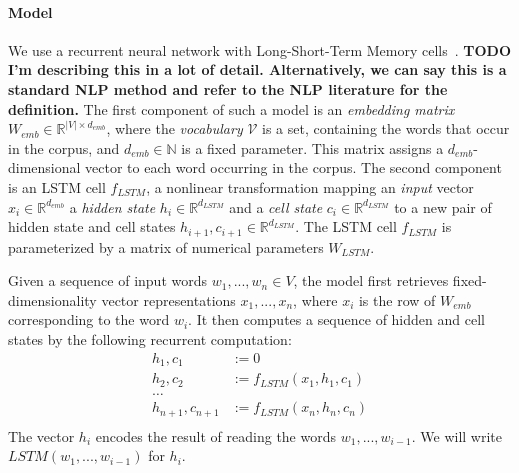\documentclass[11pt,letterpaper]{article}
\begin{document}


\paragraph{Model}
We use a recurrent neural network with Long-Short-Term Memory cells~\citep{hochreiter-long-1997}.
%
\textbf{TODO I'm describing this in a lot of detail. Alternatively, we can say this is a standard NLP method and refer to the NLP literature for the definition.}
The first component of such a model is an \emph{embedding matrix} $W_{emb} \in \mathbb{R}^{|V| \times d_{emb}}$, where the \emph{vocabulary} $\mathcal{V}$ is a set, containing the words that occur in the corpus, and $d_{emb} \in \mathbb{N}$ is a fixed parameter.
This matrix assigns a $d_{emb}$-dimensional vector to each word occurring in the corpus.
The second component is an LSTM cell $f_{LSTM}$, a nonlinear transformation mapping an \emph{input} vector $x_{i} \in \mathbb{R}^{d_{emb}}$ a \emph{hidden state} $h_i \in \mathbb{R}^{d_{LSTM}}$ and a \emph{cell state} $c_i \in \mathbb{R}^{d_{LSTM}}$ to a new pair of hidden state and cell states $h_{i+1}, c_{i+1} \in \mathbb{R}^{d_{LSTM}}$.
The LSTM cell $f_{LSTM}$ is parameterized by a matrix of numerical parameters $W_{LSTM}$.

Given a sequence of input words $w_1, ..., w_n \in V$, the model first retrieves fixed-dimensionality vector representations $x_1, ..., x_n$, where $x_i$ is the row of $W_{emb}$ corresponding to the word $w_i$.
It then computes a sequence of hidden and cell states by the following recurrent computation:
\begin{align*}
	h_1, c_1 &:= 0 \\
	h_2, c_2 &:= f_{LSTM}(x_1, h_1, c_1) \\
	\dots \\
	h_{n+1}, c_{n+1} &:= f_{LSTM}(x_n, h_n, c_n) \\
\end{align*}
The vector $h_i$ encodes the result of reading the words $w_1, ..., w_{i-1}$.
We will write $LSTM(w_1, ..., w_{i-1})$ for $h_i$.
\end{document}

